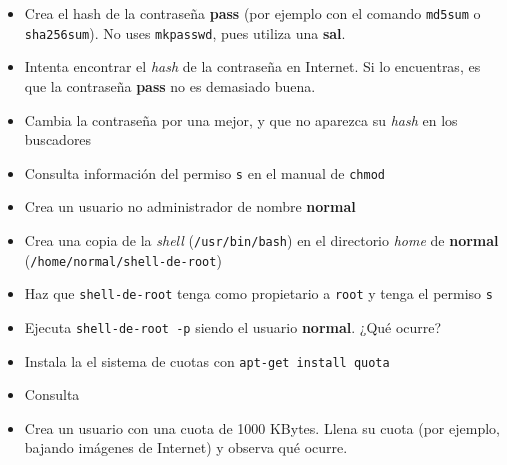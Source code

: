 \begin{homeworkProblem}
  \begin{itemize}
  \item Crea el hash de la contraseña \textbf{pass} (por ejemplo con el comando \texttt{md5sum} o \texttt{sha256sum}). No uses \texttt{mkpasswd}, pues utiliza una \textbf{sal}.
  \item Intenta encontrar el \textit{hash} de la contraseña en Internet. Si lo encuentras, es que la contraseña \textbf{pass} no es demasiado buena.
  \item Cambia la contraseña por una mejor, y que no aparezca su \textit{hash} en los buscadores
  \end{itemize}
\end{homeworkProblem}


\begin{homeworkProblem}
  
  \begin{itemize}
  \item Consulta información del permiso \texttt{s} en el manual de \texttt{chmod}
  \item Crea un usuario no administrador de nombre \textbf{normal}
  \item Crea una copia de la \textit{shell} (\texttt{/usr/bin/bash}) en el directorio \textit{home} de \textbf{normal} (\texttt{/home/normal/shell-de-root})
  \item Haz que \texttt{shell-de-root} tenga como propietario a \texttt{root} y tenga el permiso \texttt{s}
  \item Ejecuta \texttt{shell-de-root -p} siendo el usuario \textbf{normal}. ¿Qué ocurre?
  \end{itemize}
\end{homeworkProblem}

\begin{homeworkProblem}
  \begin{itemize}
  \item Instala la el sistema de cuotas con \texttt{apt-get install quota}
  \item Consulta 
    
  \item Crea un usuario con una cuota de 1000 KBytes. Llena su cuota (por ejemplo, bajando imágenes de Internet) y observa qué ocurre.
  \end{itemize}
\end{homeworkProblem}


